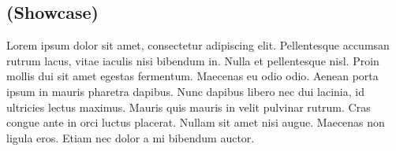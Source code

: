 
\begin{anexosenv}
\chapter{(Showcase)}

Lorem ipsum dolor sit amet, consectetur adipiscing elit. Pellentesque accumsan rutrum lacus, vitae iaculis nisi bibendum in. Nulla et pellentesque nisl. Proin mollis dui sit amet egestas fermentum. Maecenas eu odio odio. Aenean porta ipsum in mauris pharetra dapibus. Nunc dapibus libero nec dui lacinia, id ultricies lectus maximus. Mauris quis mauris in velit pulvinar rutrum. Cras congue ante in orci luctus placerat. Nullam sit amet nisi augue. Maecenas non ligula eros. Etiam nec dolor a mi bibendum auctor.

\clearpage

\end{anexosenv}

%
%

